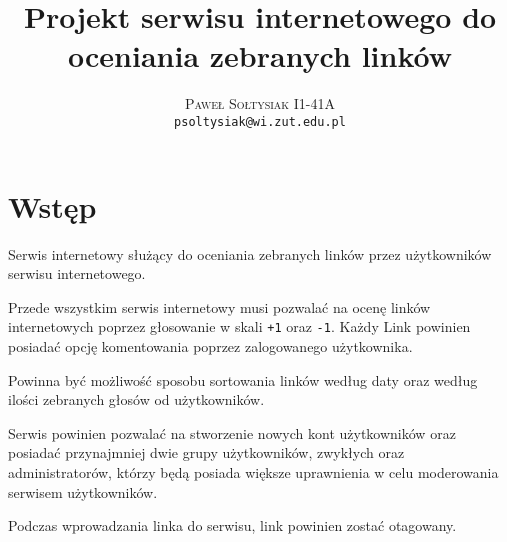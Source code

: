 \documentclass{article}
\title{Projekt serwisu internetowego do oceniania zebranych linków}
\author{\textsc{Paweł Sołtysiak I1-41A} \\ \texttt{psoltysiak@wi.zut.edu.pl}}
\begin{document}
\maketitle
\section{Wstęp}
Serwis internetowy służący do oceniania zebranych linków przez użytkowników serwisu internetowego.

Przede wszystkim serwis internetowy musi pozwalać na ocenę linków internetowych poprzez głosowanie w skali \texttt{+1} oraz \texttt{-1}. Każdy Link powinien posiadać opcję komentowania poprzez zalogowanego użytkownika.

Powinna być możliwość sposobu sortowania linków według daty oraz według ilości zebranych głosów od użytkowników.

Serwis powinien pozwalać na stworzenie nowych kont użytkowników oraz posiadać przynajmniej dwie grupy użytkowników, zwykłych oraz administratorów, którzy będą posiada większe uprawnienia w celu moderowania serwisem użytkowników.

Podczas wprowadzania linka do serwisu, link powinien zostać otagowany.
\end{document}
